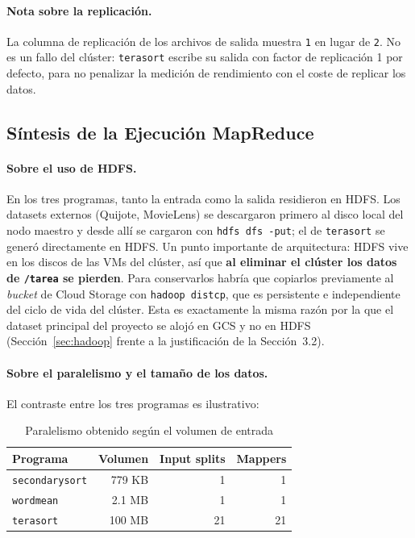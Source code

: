 
\paragraph{Nota sobre la replicación.} La columna de replicación de los archivos de salida muestra \texttt{1} en lugar de \texttt{2}. No es un fallo del clúster: \texttt{terasort} escribe su salida con factor de replicación 1 por defecto, para no penalizar la medición de rendimiento con el coste de replicar los datos.

\subsection{Síntesis de la Ejecución MapReduce}

\paragraph{Sobre el uso de HDFS.} En los tres programas, tanto la entrada como la salida residieron en HDFS. Los datasets externos (Quijote, MovieLens) se descargaron primero al disco local del nodo maestro y desde allí se cargaron con \texttt{hdfs dfs -put}; el de \texttt{terasort} se generó directamente en HDFS. Un punto importante de arquitectura: HDFS vive en los discos de las VMs del clúster, así que \textbf{al eliminar el clúster los datos de \texttt{/tarea} se pierden}. Para conservarlos habría que copiarlos previamente al \textit{bucket} de Cloud Storage con \texttt{hadoop distcp}, que es persistente e independiente del ciclo de vida del clúster. Esta es exactamente la misma razón por la que el dataset principal del proyecto se alojó en GCS y no en HDFS (Sección~\ref{sec:hadoop} frente a la justificación de la Sección~3.2).

\paragraph{Sobre el paralelismo y el tamaño de los datos.} El contraste entre los tres programas es ilustrativo:

\begin{table}[H]
\centering
\caption{Paralelismo obtenido según el volumen de entrada}
\label{tab:hadoop-paralelismo}
\vspace{0.2cm}
\small
\begin{tabular}{@{}lrrr@{}}
\toprule
\textbf{Programa} & \textbf{Volumen} & \textbf{Input splits} & \textbf{Mappers} \\
\midrule
\texttt{secondarysort} & 779 KB & 1  & 1 \\
\texttt{wordmean}      & 2.1 MB & 1  & 1 \\
\texttt{terasort}      & 100 MB & 21 & 21 \\
\bottomrule
\end{tabular}
\end{table}

